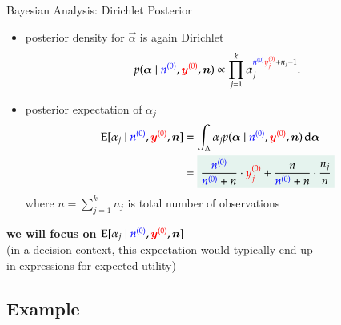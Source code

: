 \documentclass{beamer}
\def\rot#1{{\color{red}#1}}
\def\gruen#1{{\color{blue}#1}}
\def\byzr{\rot{\byz}}
\def\bynr{\rot{\byn}}
\def\yzjr{\rot{y\uz_j}}
\def\nzg{\gruen{\nz}}
\def\nng{\gruen{\nn}}
\begin{document}
\begin{frame}{Bayesian Analysis: Dirichlet Posterior}
  \begin{itemize}
  \item posterior density for $\vec{\alpha}$ is again Dirichlet
    \begin{align*}
      p(\vec{\alpha}\mid\nzg,\byzr,\vec{n})
      \propto
      \prod_{j=1}^k\alpha_j^{\nzg\yzjr+n_j-1}.
    \end{align*}
  \item posterior expectation of $\alpha_j$
    \begin{align*}
      \E[\alpha_j\mid\nzg,\byzr,\vec{n}]
      &=
      \int_{\Delta}\alpha_j p(\vec{\alpha}\mid\nzg,\byzr,\vec{n})\dd\vec{\alpha} \\
      &=
      \colorbox{lmugreen!10!white}{$\displaystyle
      \frac{\nzg}{\nzg+n} \cdot \yzjr + \frac{n}{\nzg+n} \cdot \frac{n_j}{n}
      $}
    \end{align*}
    where $n=\sum_{j=1}^k n_j$ is total number of observations
  \end{itemize}
  \begin{center}
    \textbf{we will focus on $\E[\alpha_j\mid\nzg,\byzr,\vec{n}]$} \\
    (in a decision context, this expectation would typically end up \\
    in expressions for expected utility)
  \end{center}
\end{frame}

\subsection{Example}
\end{document}
